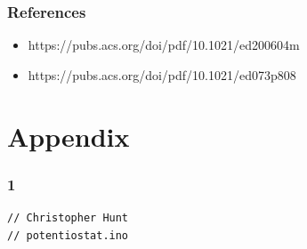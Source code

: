 \documentclass{article}
\begin{document}
\subsubsection*{References}
\begin{itemize}
\item https://pubs.acs.org/doi/pdf/10.1021/ed200604m
\item https://pubs.acs.org/doi/pdf/10.1021/ed073p808
\end{itemize}
\newpage
\section*{Appendix}
\subsubsection*{1}
\begin{lstlisting}
// Christopher Hunt
// potentiostat.ino



\end{lstlisting}
\end{document}

